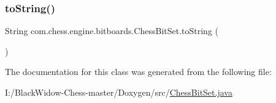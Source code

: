 \mbox{\label{classcom_1_1chess_1_1engine_1_1bitboards_1_1_chess_bit_set_abd20d2df1988da73fed7b26b0e9ebb10}} 
\subsubsection{\texorpdfstring{toString()}{toString()}}
{\footnotesize\ttfamily String com.\+chess.\+engine.\+bitboards.\+Chess\+Bit\+Set.\+to\+String (\begin{DoxyParamCaption}{ }\end{DoxyParamCaption})}



The documentation for this class was generated from the following file\+:\begin{DoxyCompactItemize}
\item 
I\+:/\+Black\+Widow-\/\+Chess-\/master/\+Doxygen/src/\mbox{\hyperlink{_chess_bit_set_8java}{Chess\+Bit\+Set.\+java}}\end{DoxyCompactItemize}
